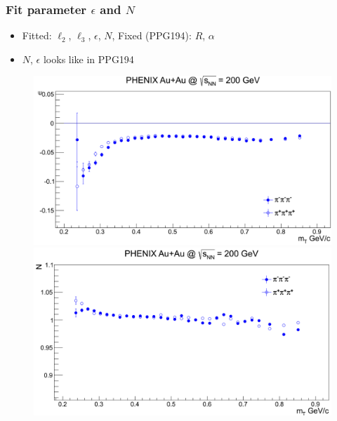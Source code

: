 \documentclass{beamer}
\begin{document}
\begin{frame}
\frametitle{Fit parameter $\epsilon$ and $N$}
\begin{itemize}
\setlength{\itemsep}{10pt}
\item Fitted: $\ell_2$, $\ell_3$, $\epsilon$, $N$, Fixed (PPG194): $R$, $\alpha$
\item $N$, $\epsilon$ looks like in PPG194
\end{itemize}
\begin{figure}
\includegraphics[scale=0.2]{pic/epsilon}
\includegraphics[scale=0.2]{pic/N}

\end{figure}
\end{frame}
\end{document}
